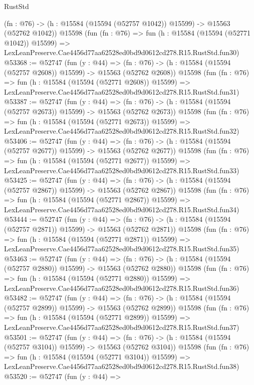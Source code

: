 \begin{lexlean}{RustStd}
\begin{coremodule}
    (fn : @76) -> (h : @15584 (@15594 (@52757 @1042)) @15599) -> @15563 (@52762 @1042))
    @15598
    (fun (fn : @76) =>
    fun (h : @15584 (@15594 (@52771 @1042)) @15599) =>
    LexLeanPreserve.Cae4456d77aa62528ed0bd9d0612cd278.R15.RustStd.fun30)
@53368 := @52747
    (fun (y : @44) =>
    (fn : @76) -> (h : @15584 (@15594 (@52757 @2608)) @15599) -> @15563 (@52762 @2608))
    @15598
    (fun (fn : @76) =>
    fun (h : @15584 (@15594 (@52771 @2608)) @15599) =>
    LexLeanPreserve.Cae4456d77aa62528ed0bd9d0612cd278.R15.RustStd.fun31)
@53387 := @52747
    (fun (y : @44) =>
    (fn : @76) -> (h : @15584 (@15594 (@52757 @2673)) @15599) -> @15563 (@52762 @2673))
    @15598
    (fun (fn : @76) =>
    fun (h : @15584 (@15594 (@52771 @2673)) @15599) =>
    LexLeanPreserve.Cae4456d77aa62528ed0bd9d0612cd278.R15.RustStd.fun32)
@53406 := @52747
    (fun (y : @44) =>
    (fn : @76) -> (h : @15584 (@15594 (@52757 @2677)) @15599) -> @15563 (@52762 @2677))
    @15598
    (fun (fn : @76) =>
    fun (h : @15584 (@15594 (@52771 @2677)) @15599) =>
    LexLeanPreserve.Cae4456d77aa62528ed0bd9d0612cd278.R15.RustStd.fun33)
@53425 := @52747
    (fun (y : @44) =>
    (fn : @76) -> (h : @15584 (@15594 (@52757 @2867)) @15599) -> @15563 (@52762 @2867))
    @15598
    (fun (fn : @76) =>
    fun (h : @15584 (@15594 (@52771 @2867)) @15599) =>
    LexLeanPreserve.Cae4456d77aa62528ed0bd9d0612cd278.R15.RustStd.fun34)
@53444 := @52747
    (fun (y : @44) =>
    (fn : @76) -> (h : @15584 (@15594 (@52757 @2871)) @15599) -> @15563 (@52762 @2871))
    @15598
    (fun (fn : @76) =>
    fun (h : @15584 (@15594 (@52771 @2871)) @15599) =>
    LexLeanPreserve.Cae4456d77aa62528ed0bd9d0612cd278.R15.RustStd.fun35)
@53463 := @52747
    (fun (y : @44) =>
    (fn : @76) -> (h : @15584 (@15594 (@52757 @2880)) @15599) -> @15563 (@52762 @2880))
    @15598
    (fun (fn : @76) =>
    fun (h : @15584 (@15594 (@52771 @2880)) @15599) =>
    LexLeanPreserve.Cae4456d77aa62528ed0bd9d0612cd278.R15.RustStd.fun36)
@53482 := @52747
    (fun (y : @44) =>
    (fn : @76) -> (h : @15584 (@15594 (@52757 @2899)) @15599) -> @15563 (@52762 @2899))
    @15598
    (fun (fn : @76) =>
    fun (h : @15584 (@15594 (@52771 @2899)) @15599) =>
    LexLeanPreserve.Cae4456d77aa62528ed0bd9d0612cd278.R15.RustStd.fun37)
@53501 := @52747
    (fun (y : @44) =>
    (fn : @76) -> (h : @15584 (@15594 (@52757 @3104)) @15599) -> @15563 (@52762 @3104))
    @15598
    (fun (fn : @76) =>
    fun (h : @15584 (@15594 (@52771 @3104)) @15599) =>
    LexLeanPreserve.Cae4456d77aa62528ed0bd9d0612cd278.R15.RustStd.fun38)
@53520 := @52747
    (fun (y : @44) =>

\end{coremodule}
\end{lexlean}
